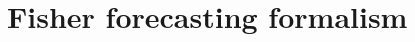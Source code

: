 \documentclass[prd,aps,10pt,nofootinbib,twocolumn,superscriptaddress,preprintnumbers,balancelastpage,longbibliography]{revtex4-1}
\newcommand{\blue}[1]{\textcolor{deepblue}{\bf #1}}
\begin{document}



\section{Fisher forecasting formalism}
\label{sec:fisher}
\end{document}
